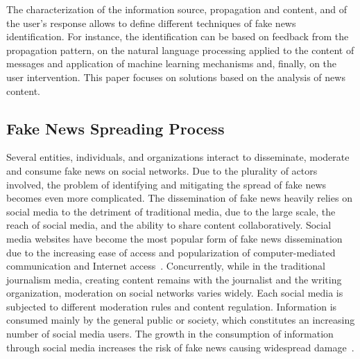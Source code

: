 \documentclass{ieeeaccess}
\begin{document}
The characterization of the information source, propagation and content, and of the user's response allows to define different techniques of fake news identification. For instance, the identification can be based on feedback from the propagation pattern, on the natural language processing applied to the content of messages and application of machine learning mechanisms and, finally, on the user intervention. This paper focuses on solutions based on the analysis of news content.


\subsection{Fake News Spreading Process}

Several entities, individuals, and organizations interact to disseminate, moderate and consume fake news on social networks. Due to the plurality of actors involved, the problem of identifying and mitigating the spread of fake news becomes even more complicated. The dissemination of fake news heavily relies on social media to the detriment of traditional media, due to the large scale, the reach of social media, and the ability to share content collaboratively. Social media websites have become the most popular form of fake news dissemination due to the increasing ease of access and popularization of computer-mediated communication and Internet access~\cite{Mattos2019}. Concurrently, while in the traditional journalism media, creating content remains with the journalist and the writing organization, moderation on social networks varies widely. Each social media is subjected to different moderation rules and content regulation. Information is consumed mainly by the general public or society, which constitutes an increasing number of social media users. The growth in the consumption of information through social media increases the risk of fake news causing widespread damage~\cite{sharma2019combating}.
\end{document}
